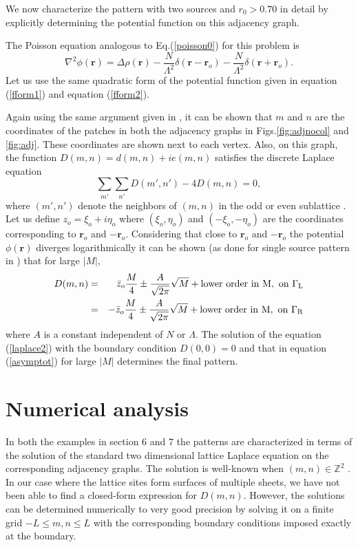 \documentclass[11pt,a4paper]{book}
\begin{document}
We now characterize the pattern  with two sources and $r_0 > 0.70$ in detail by explicitly determining
the potential function on this  adjacency graph.

The Poisson equation analogous to Eq.(\ref{poisson0}) for this problem is
\begin{equation}
\nabla^2\phi(\mathbf{r})=\Delta\rho(\mathbf{r})-\frac{N}{\Lambda^2}\delta(\mathbf{r}-\mathbf{r}_o)-\frac{N}{\Lambda^2}\delta(\mathbf{r}+\mathbf{r}_o).
\label{poisson2}
\end{equation}
Let us use the same quadratic form of the potential
function given in equation (\ref{fform1}) and equation (\ref{fform2}).

Again using the same argument given in \cite{myepl}, it can be shown that
$m$ and $n$ are the coordinates of the patches in both the adjacency graphs
in Figs.\ref{fig:adjnocol} and \ref{fig:adj}. These coordinates are shown  next
to each vertex. Also, on this graph, the function $D(m,n)=d(m,n)+ie(m,n)$  satisfies the discrete Laplace equation
\begin{equation}
\sum_{m'}\sum_{n'}D(m',n')-4D(m,n)=0,
\label{laplace2}
\end{equation}
where $\left( m', n' \right)$ denote the neighbors of $\left( m, n \right)$
in the odd or even sublattice \cite{duffin}.
Let us define $z_o=\xi_o+i\eta_o$ where $(\xi_o,\eta_o)$ and
$(-\xi_{o},-\eta_{o})$ are the coordinates corresponding to $\mathbf{r}_{o}$ and $-\mathbf{r}_{o}$.
Considering that close to $\mathbf{r}_{o}$ and $-\mathbf{r}_{o}$ the potential
$\phi\left( \mathbf{r} \right)$ diverges logarithmically it can be shown (as done for single source pattern
in \cite{myepl}) that for large $|M|$,
\begin{eqnarray}
D(m,n)&=&\bar{z}_o\frac{M}{4}\pm\frac{A}{\sqrt{2\pi}}\sqrt{M}+\rm{lower ~ order ~ in ~}M \rm{, ~on~ }\Gamma_L\nonumber \\
&=&-\bar{z}_o\frac{M}{4}\pm\frac{A}{\sqrt{2\pi}}\sqrt{M}+\rm{lower ~ order ~ in ~}M \rm{, ~on~  }\Gamma_R
\label{asymptot}
\end{eqnarray}
where $A$ is a constant independent of $N$ or $\Lambda$. The solution of
the equation (\ref{laplace2}) with the boundary condition $D(0,0)=0$ and that in equation (\ref{asymptot})
for large $|M|$ determines the final pattern.


\section{Numerical analysis}\label{ch3.7}
In both the examples in section $6$ and $7$ the patterns are characterized in terms
of the solution of the standard two dimensional lattice Laplace equation on the corresponding adjacency graphs.
The solution is well-known when $\left( m, n \right)\in\mathbb{Z}^{2}$ \cite{spitzer}.
In our case where the lattice sites form surfaces of multiple sheets, we have not been able to find a 
closed-form expression for $D(m,n)$. However, the
solutions can be determined numerically to very good precision by solving it on a finite
grid $-L\le m, n\le L$ with the corresponding boundary conditions imposed exactly at
the boundary.
\end{document}
